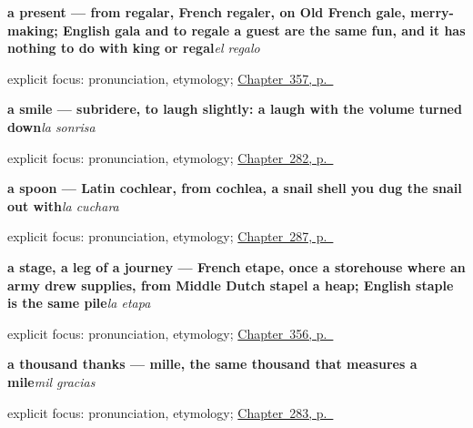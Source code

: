 \noindent\begin{minipage}[t]{\linewidth}
\raggedright
\textbf{a present — from regalar, French regaler, on Old French gale, merry-making; English gala and to regale a guest are the same fun, and it has nothing to do with king or regal}\enspace\emph{el regalo}\par
\footnotesize explicit focus: pronunciation, etymology; \hyperref[ch:la-navidad-y-la-pascua]{Chapter~357, p.~\pageref*{ch:la-navidad-y-la-pascua}}
\end{minipage}\par\smallskip

\noindent\begin{minipage}[t]{\linewidth}
\raggedright
\textbf{a smile — subridere, to laugh slightly: a laugh with the volume turned down}\enspace\emph{la sonrisa}\par
\footnotesize explicit focus: pronunciation, etymology; \hyperref[ch:encuentro]{Chapter~282, p.~\pageref*{ch:encuentro}}
\end{minipage}\par\smallskip

\noindent\begin{minipage}[t]{\linewidth}
\raggedright
\textbf{a spoon — Latin cochlear, from cochlea, a snail shell you dug the snail out with}\enspace\emph{la cuchara}\par
\footnotesize explicit focus: pronunciation, etymology; \hyperref[ch:cinco-cosas]{Chapter~287, p.~\pageref*{ch:cinco-cosas}}
\end{minipage}\par\smallskip

\noindent\begin{minipage}[t]{\linewidth}
\raggedright
\textbf{a stage, a leg of a journey — French etape, once a storehouse where an army drew supplies, from Middle Dutch stapel a heap; English staple is the same pile}\enspace\emph{la etapa}\par
\footnotesize explicit focus: pronunciation, etymology; \hyperref[ch:desde-y-de-repente]{Chapter~356, p.~\pageref*{ch:desde-y-de-repente}}
\end{minipage}\par\smallskip

\noindent\begin{minipage}[t]{\linewidth}
\raggedright
\textbf{a thousand thanks — mille, the same thousand that measures a mile}\enspace\emph{mil gracias}\par
\footnotesize explicit focus: pronunciation, etymology; \hyperref[ch:cortesia]{Chapter~283, p.~\pageref*{ch:cortesia}}
\end{minipage}\par\smallskip

